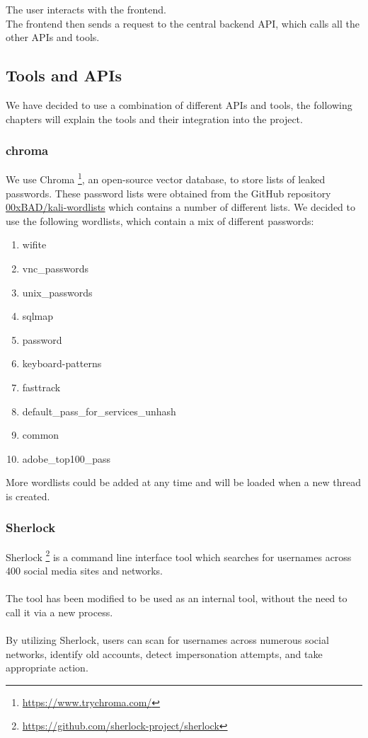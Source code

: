 \documentclass[
    a4paper,
    pagesize,
	pdftex,
    12pt,
]{scrartcl}
\begin{document}
The user interacts with the frontend. \\
The frontend then sends a request to the central backend API, which calls all the other APIs and tools.

\subsection{Tools and APIs}
We have decided to use a combination of different APIs and tools, the following chapters will explain the tools and their integration into the project.

\subsubsection{chroma}
We use Chroma \footnote{\url{https://www.trychroma.com/}}, an open-source vector database, to store lists of leaked passwords. These password lists were obtained from the GitHub repository \hyperlink{https://github.com/00xBAD/kali-wordlists}{00xBAD/kali-wordlists} which contains a number of different lists. We decided to use the following wordlists, which contain a mix of different passwords:
\begin{enumerate}
	\item wifite
	\item vnc\_passwords
	\item unix\_passwords
	\item sqlmap
	\item password
	\item keyboard-patterns
	\item fasttrack
	\item default\_pass\_for\_services\_unhash
	\item common
	\item adobe\_top100\_pass
\end{enumerate}
More wordlists could be added at any time and will be loaded when a new thread is created.

\subsubsection{Sherlock}
Sherlock \footnote{\url{https://github.com/sherlock-project/sherlock}} is a command line interface tool which searches for usernames across 400 social media sites and networks.
\\ \\
The tool has been modified to be used as an internal tool, without the need to call it via a new process.
\\ \\
By utilizing Sherlock, users can scan for usernames across numerous social networks, identify old accounts, detect impersonation attempts, and take appropriate action.
\end{document}
